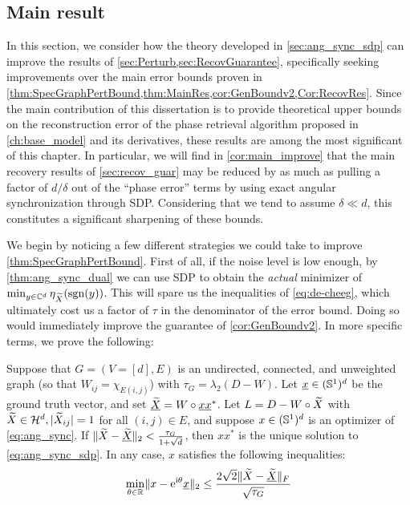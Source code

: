 \subsection{Main result}
In this section, we consider how the theory developed in \cref{sec:ang_sync_sdp} can improve the results of \cref{sec:Perturb,sec:RecovGuarantee}, specifically seeking improvements over the main error bounds proven in \cref{thm:SpecGraphPertBound,thm:MainRes,cor:GenBoundv2,Cor:RecovRes}.  Since the main contribution of this dissertation is to provide theoretical upper bounds on the reconstruction error of the phase retrieval algorithm proposed in \cref{ch:base_model} and its derivatives, these results are among the most significant of this chapter.  In particular, we will find in \cref{cor:main_improve} that the main recovery results of \cref{sec:recov_guar} may be reduced by as much as pulling a factor of $d / \delta$ out of the ``phase error'' terms by using exact angular synchronization through SDP.  Considering that we tend to assume $\delta \ll d$, this constitutes a significant sharpening of these bounds.

We begin by noticing a few different strategies we could take to improve \cref{thm:SpecGraphPertBound}.  First of all, if the noise level is low enough, by \cref{thm:ang_sync_dual} we can use SDP to obtain the \emph{actual} minimizer of $\min_{y \in \mathbb{C}^d} \eta_{\widetilde{X}}(\operatorname{sgn}(y))$.  This will spare us the inequalities of \eqref{eq:de-cheeg}, which ultimately cost us a factor of $\tau$ in the denominator of the error bound.  Doing so would immediately improve the guarantee of \cref{cor:GenBoundv2}.  In more specific terms, we prove the following:

\begin{theorem}
  Suppose that $G = (V=[d], E)$ is an undirected, connected, and unweighted graph (so that $W_{ij} = \chi_{E(i, j)}$) with $\tau_G = \lambda_2(D - W)$.  Let $\underline{x} \in (\mathbb{S}^1)^d$ be the ground truth vector, and set $\underline{\widetilde{X}} = W \circ \underline{x} \underline{x}^*$.  Let $L = D - W \circ \widetilde{X}$ with $\widetilde{X} \in \mathcal{H}^d, |\widetilde{X}_{ij}| = 1$ for all $(i, j) \in E$, and suppose $x \in (\mathbb{S}^1)^d$ is an optimizer of \eqref{eq:ang_sync}.  If $\lVert \widetilde{X} - \underline{\widetilde{X}} \rVert_2 < \frac{\tau_G}{1 + \sqrt{d}}$, then $x x^*$ is the unique solution to \eqref{eq:ang_sync_sdp}.  In any case, $x$ satisfies the following inequalities:
  \begin{equation}
    \min_{\theta \in \mathbb{R}} \lVert x - \mathrm{e}^{\mathrm{i} \theta} \underline{x} \rVert_2 \le
    \dfrac{2 \sqrt{2} \lVert \widetilde{X} - \underline{\widetilde{X}} \rVert_F}{\sqrt{\tau_G}} \label{eq:ISP2}
  \end{equation}
  \label{thm:improved_spec_pert}
\end{theorem}

